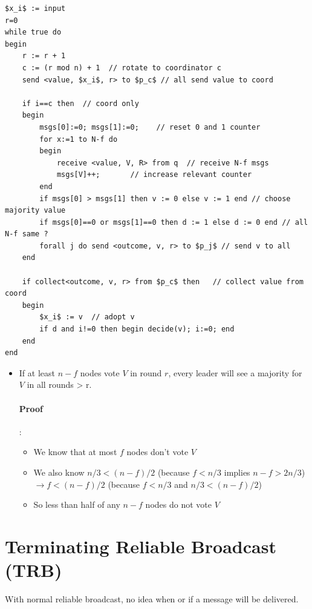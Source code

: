 \begin{lstlisting}[caption={Rotate coordinator for $\Diamond S$}, mathescape]
$x_i$ := input
r=0
while true do
begin
    r := r + 1
    c := (r mod n) + 1  // rotate to coordinator c
    send <value, $x_i$, r> to $p_c$ // all send value to coord

    if i==c then  // coord only
    begin
        msgs[0]:=0; msgs[1]:=0;    // reset 0 and 1 counter
        for x:=1 to N-f do
        begin
            receive <value, V, R> from q  // receive N-f msgs
            msgs[V]++;       // increase relevant counter
        end
        if msgs[0] > msgs[1] then v := 0 else v := 1 end // choose majority value
        if msgs[0]==0 or msgs[1]==0 then d := 1 else d := 0 end // all N-f same ?
        forall j do send <outcome, v, r> to $p_j$ // send v to all
    end

    if collect<outcome, v, r> from $p_c$ then   // collect value from coord
    begin
        $x_i$ := v  // adopt v
        if d and i!=0 then begin decide(v); i:=0; end
    end
end
\end{lstlisting}

\begin{itemize}
    \item If at least $n-f$ nodes vote $V$ in round $r$, every leader will see
    a majority for $V$ in all rounds > r.

        \paragraph{Proof}:
        \begin{itemize}
            \item We know that at most $f$ nodes don't vote $V$
            \item We also know $n/3<(n-f)/2$ (because $f<n/3$ implies $n-f>2n/3$)
                $\to f<(n-f)/2$ (because $f<n/3$ and $n/3<(n-f)/2$)
            \item So less than half of any $n-f$ nodes do not vote $V$
        \end{itemize}
\end{itemize}


\section{Terminating Reliable Broadcast (TRB)}

With normal reliable broadcast, no idea when or if a message will be delivered.

